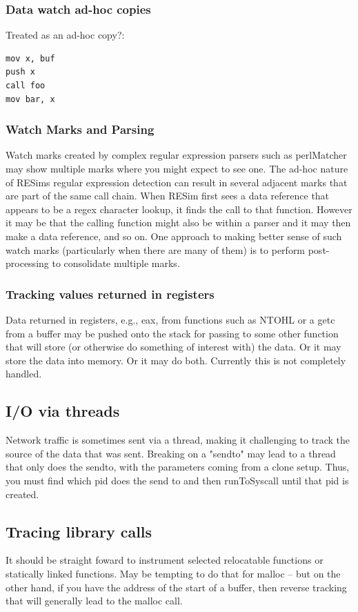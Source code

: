 \documentclass[titlepage]{article}
\begin{document}
\begin{appendices}
\subsubsection{Data watch ad-hoc copies}
Treated as an ad-hoc copy?:
\begin{verbatim}
mov x, buf
push x
call foo
mov bar, x
\end{verbatim}

\subsubsection{Watch Marks and Parsing}
Watch marks created by complex regular expression parsers such as perlMatcher may show multiple marks where you might expect to see one.  The ad-hoc nature
of RESims regular expression detection can result in several adjacent marks that are part of the same call chain.  When RESim first sees a data reference
that appears to be a regex character lookup, it finds the call to that function.  However it may be that the calling function might also be within a parser
and it may then make a data reference, and so on.  One approach to making better sense of such watch marks (particularly when there are many of them) is
to perform post-processing to consolidate multiple marks. 

\subsubsection{Tracking values returned in registers}
Data returned in registers, e.g., eax, from functions such as NTOHL or a getc from a buffer may be pushed onto the stack for passing to some
other function that will store (or otherwise do something of interest with) the data.  Or it may store the data into memory.  Or it may do both.
Currently this is not completely handled.

\subsection{I/O via threads}
Network traffic is sometimes sent via a thread, making it challenging to track the source of the data that was sent.  Breaking on a "sendto" may
lead to a thread that only does the sendto, with the parameters coming from a clone setup.  Thus, you must find which pid does the send to and then
runToSyscall until that pid is created.

\subsection{Tracing library calls}
It should be straight foward to instrument selected relocatable functions or statically linked functions.
May be tempting to do that for malloc -- but on the other hand, if you have the address of the start of a buffer, then reverse tracking that
will generally lead to the malloc call.



\end{appendices}
\end{document}
